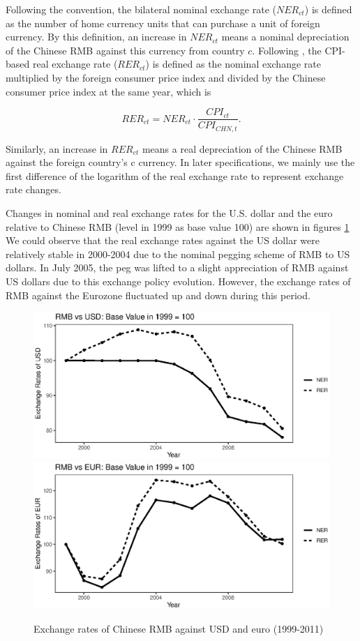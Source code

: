 \documentclass[12pt]{article}
\begin{document}
Following the convention, the bilateral nominal exchange rate ($NER_{ct}$) is defined as the number of home currency units that can purchase a unit of foreign currency. By this definition, an increase in $NER_{ct}$ means a nominal depreciation of the Chinese RMB against this currency from country $c$. Following \cite{lmx2015}, the CPI-based real exchange rate ($RER_{ct}$) is defined as the nominal exchange rate multiplied by the foreign consumer price index and divided by the Chinese consumer price index at the same year, which is

$$
RER_{ct}=NER_{ct} \cdot \frac{CPI_{ct}}{CPI_{CHN,t}}.
$$

Similarly, an increase in $RER_{ct}$ means a real depreciation of the Chinese RMB against the foreign country's c currency. In later specifications, we mainly use the first difference of the logarithm of the real exchange rate to represent exchange rate changes.

Changes in nominal and real exchange rates for the U.S. dollar and the euro relative to Chinese RMB (level in 1999 as base value 100) are shown in figures \ref{fig.ER} We could observe that the real exchange rates against the US dollar were relatively stable in 2000-2004 due to the nominal pegging scheme of RMB to US dollars. In July 2005, the peg was lifted to a slight appreciation of RMB against US dollars due to this exchange policy evolution. However, the exchange rates of RMB against the Eurozone fluctuated up and down during this period. 

\begin{figure}[htbp]
	\centering
	\includegraphics[width=1\textwidth]{R/USD.eps}
	\includegraphics[width=1\textwidth]{R/EUR.eps}
	\caption{Exchange rates of Chinese RMB against USD and euro (1999-2011)}
	\label{fig.ER}
\end{figure}
\end{document}
